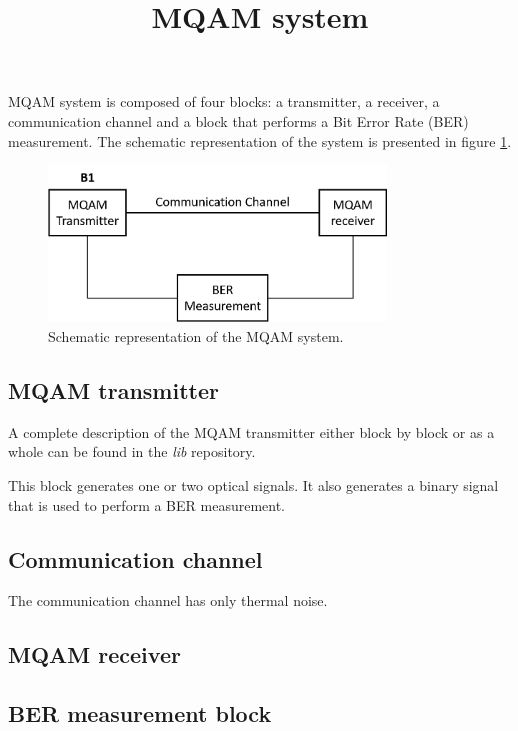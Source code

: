 \documentclass[a4paper]{article}
\title{MQAM system}
\begin{document}
	
	\maketitle
	
MQAM system is composed of four blocks: a transmitter, a receiver, a communication channel and a block that performs a Bit Error Rate (BER) measurement. The schematic representation of the system is presented in figure \ref{MQAM_system_block_diagram}.

\begin{figure}
	\centering
	\includegraphics[width=0.8\textwidth]{MQAM_system_block_diagram}
	\caption{Schematic representation of the MQAM system.}\label{MQAM_system_block_diagram}
\end{figure}

\subsection*{MQAM transmitter}

A complete description of the MQAM transmitter either block by block or as a whole can be found in the \textit{lib} repository. 

This block generates one or two optical signals. It also generates a binary signal that is used to perform a BER measurement.

\subsection*{Communication channel}

The communication channel has only thermal noise.

\subsection*{MQAM receiver}

\subsection*{BER measurement block}
\end{document}
